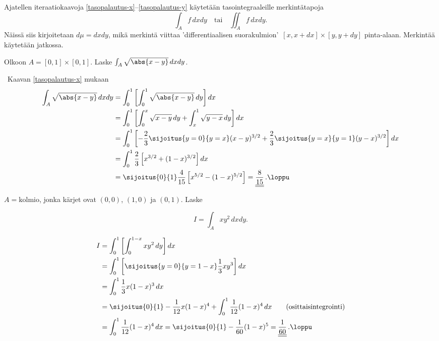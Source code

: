Ajatellen iteraatiokaavoja \eqref{tasopalautus-x}--\eqref{tasopalautus-y} käytetään 
tasointegraaleille merkintätapoja
\[
\int_A f\, dxdy\quad\text{tai} \quad \iint_A f\, dxdy.
\]
Näissä siis kirjoitetaan $d\mu=dxdy$, mikä merkintä viittaa 'differentiaalisen suorakulmion' 
$\,[x,x+dx]\times[y,y+dy]$ pinta-alaan. Merkintää käytetään jatkossa.
\begin{Exa} Olkoon $A=[0,1]\times[0,1]$. Laske $\int_A \sqrt{\abs{x-y}}\,dxdy$. \end{Exa}
\ratk \ Kaavan \eqref{tasopalautus-x} mukaan
\begin{align*}
\int_A \sqrt{\abs{x-y}}\,dxdy 
&= \int_0^1 \left[ \int_0^1 \sqrt{\abs{x-y}}\,dy \right] dx \\
&= \int_0^1 \left[ \int_0^x \sqrt{x-y}\,dy + \int_x^1 \sqrt{y-x}\, dy \right] dx \\
&= \int_0^1 \left[ -\frac{2}{3}\sijoitus{y=0}{y=x} (x-y)^{3/2}
                   +\frac{2}{3}\sijoitus{y=x}{y=1} (y-x)^{3/2} \right] dx \\
&= \int_0^1 \frac{2}{3} \left[ x^{3/2}+(1-x)^{3/2} \right] dx \\
&= \sijoitus{0}{1} \frac{4}{15} \left[ x^{5/2}-(1-x)^{5/2} \right] 
 = \underline{\underline{\frac{8}{15}}}\,. \loppu
\end{align*}
\begin{Exa}
$A=\text{kolmio}$, jonka kärjet ovat $(0,0)$, $(1,0)$ ja $(0,1)$. Laske
\begin{multicols}{2} \raggedcolumns
\[
I=\int_A xy^2\,dxdy.
\]
\begin{figure}[H]
\begin{center}

\end{center}
\end{figure}
\end{multicols}
\end{Exa}
\ratk
\begin{align*}
I &= \int_0^1\left[\int_0^{1-x} xy^2\,dy\right] dx \\
  &= \int_0^1 \left[\sijoitus{y=0}{y=1-x} \frac{1}{3}xy^3\right] dx \\
  &= \int_0^1 \frac{1}{3}x(1-x)^3\,dx \\
  &= \sijoitus{0}{1} -\frac{1}{12}x(1-x)^4 + \int_0^1 \frac{1}{12}(1-x)^4\,dx
     \qquad \text{(osittaisintegrointi)} \\
  &= \int_0^1 \frac{1}{12}(1-x)^4\,dx = \sijoitus{0}{1} -\frac{1}{60}(1-x)^5
   = \underline{\underline{\frac{1}{60}}}\,. \loppu
\end{align*}

